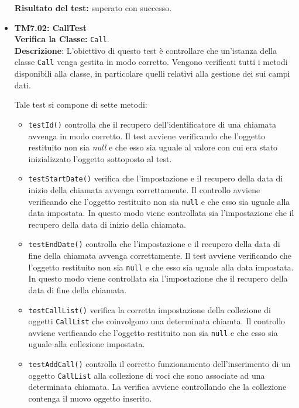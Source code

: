 \begin{itemize}
\begin{itemize}
 
\end{itemize}
\textbf{Risultato del test:} superato con successo.

\item \textbf{TM7.02: CallTest}\\
\textbf{Verifica la Classe:} \texttt{Call}.\\
\textbf{Descrizione}: L'obiettivo di questo test è controllare che un'istanza della classe \texttt{Call} venga gestita in modo corretto. Vengono verificati tutti i metodi disponibili alla classe, in particolare quelli relativi alla gestione dei sui campi dati.

Tale test si compone di sette metodi:
\begin{itemize}

\item \texttt{testId()} controlla che il recupero dell'identificatore di una chiamata avvenga in modo corretto. 
Il test avviene verificando che l'oggetto restituito non sia \textit{null} e che esso sia uguale al valore con cui era stato inizializzato l'oggetto sottoposto al test.

\item \texttt{testStartDate()} verifica che l'impostazione e il recupero della data di inizio della chiamata avvenga correttamente.
Il controllo avviene verificando che l'oggetto restituito non sia \texttt{null} e che esso sia uguale alla data impostata. In questo modo viene controllata sia l'impostazione che il recupero della data di inizio della chiamata.

\item \texttt{testEndDate()} controlla che l'impostazione e il recupero della data di fine della chiamata avvenga correttamente.
Il test avviene verificando che l'oggetto restituito non sia \texttt{null} e che esso sia uguale alla data impostata. In questo modo viene controllata sia l'impostazione che il recupero della data di fine della chiamata.

\item \texttt{testCallList()} verifica la corretta impostazione  della collezione di oggetti \texttt{CallList} che coinvolgono una determinata chiamta. 
Il controllo avviene verificando che l'oggetto restituito non sia \texttt{null} e che esso sia uguale alla collezione impostata.

\item \texttt{testAddCall()} controlla il corretto funzionamento dell'inserimento di un oggetto \texttt{CallList} alla collezione di voci che sono associate ad una determinata chiamata. La verifica avviene controllando che la collezione contenga il nuovo oggetto inserito.


\end{itemize}
\end{itemize}
